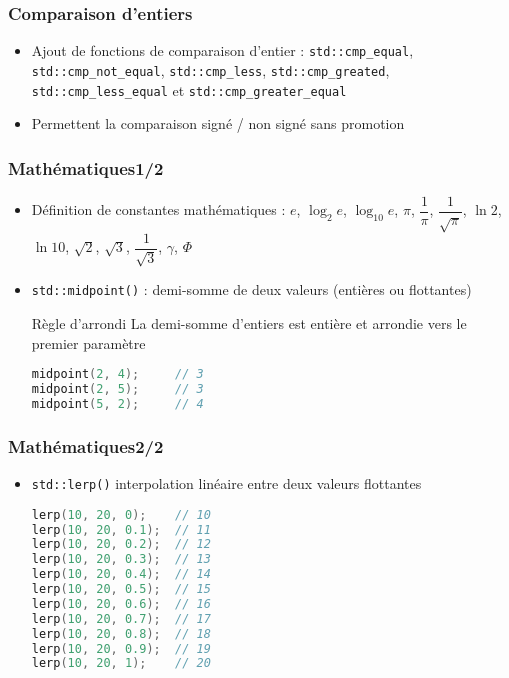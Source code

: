 \documentclass[C++.tex]{subfiles}
\begin{document}
\begin{frame}[fragile]
	\frametitle{Comparaison d'entiers}
	\begin{itemize}
		\item Ajout de fonctions de comparaison d'entier : \lstinline|std::cmp_equal|, \lstinline|std::cmp_not_equal|, \lstinline|std::cmp_less|, \lstinline|std::cmp_greated|, \lstinline|std::cmp_less_equal| et \lstinline|std::cmp_greater_equal|
		\item Permettent la comparaison signé / non signé sans promotion
	\end{itemize}
\end{frame}

\begin{frame}[fragile]
	\frametitle{Mathématiques\titlehfill{}1/2}
	\begin{itemize}
		\item Définition de constantes mathématiques : $e$, $\log_2 e$, $\log_{10} e$, $\pi$, $\dfrac{1}{\pi}$, $\dfrac{1}{\sqrt{\pi}}$, $\ln{2}$, $\ln{10}$, $\sqrt{2}$, $\sqrt{3}$, $\dfrac{1}{\sqrt{3}}$, $\gamma$, $\Phi$


		\item \lstinline|std::midpoint()| : demi-somme de deux valeurs (entières ou flottantes)

		\begin{block}{Règle d'arrondi}
			La demi-somme d'entiers est entière et arrondie vers le premier paramètre
		\end{block}
		
		\begin{lstlisting}[language=C++]
midpoint(2, 4);     // 3
midpoint(2, 5);     // 3
midpoint(5, 2);     // 4\end{lstlisting}
	\end{itemize}
\end{frame}

\begin{frame}[fragile]
\frametitle{Mathématiques\titlehfill{}2/2}
	\begin{itemize}
		\item \lstinline|std::lerp()| interpolation linéaire entre deux valeurs flottantes

		\begin{lstlisting}[language=C++]
lerp(10, 20, 0);    // 10
lerp(10, 20, 0.1);  // 11
lerp(10, 20, 0.2);  // 12
lerp(10, 20, 0.3);  // 13
lerp(10, 20, 0.4);  // 14
lerp(10, 20, 0.5);  // 15
lerp(10, 20, 0.6);  // 16
lerp(10, 20, 0.7);  // 17
lerp(10, 20, 0.8);  // 18
lerp(10, 20, 0.9);  // 19
lerp(10, 20, 1);    // 20\end{lstlisting}
	\end{itemize}
\end{frame}
\end{document}
